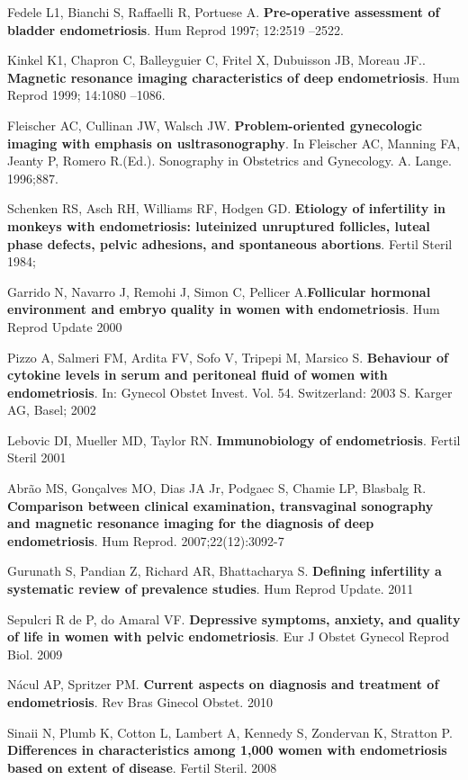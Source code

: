 \documentclass[12pt]{article} %
\begin{document}
Fedele L1, Bianchi S, Raffaelli R, Portuese A. \textbf{Pre-operative assessment of bladder endometriosis}. Hum Reprod 1997; 12:2519 –2522.

Kinkel K1, Chapron C, Balleyguier C, Fritel X, Dubuisson JB, Moreau JF.. \textbf{Magnetic resonance imaging characteristics of deep endometriosis}. Hum Reprod 1999; 14:1080 –1086.

Fleischer AC, Cullinan JW, Walsch JW.\textbf{ Problem-oriented gynecologic imaging with emphasis on usltrasonography}. In Fleischer AC, Manning FA, Jeanty P, Romero R.(Ed.). Sonography in Obstetrics and Gynecology. A.
Lange. 1996;887.

Schenken RS, Asch RH, Williams RF, Hodgen GD.\textbf{ Etiology of infertility in
monkeys with endometriosis: luteinized unruptured follicles, luteal phase
defects, pelvic adhesions, and spontaneous abortions}. Fertil Steril 1984;

Garrido N, Navarro J, Remohi J, Simon C, Pellicer A.\textbf{Follicular hormonal
environment and embryo quality in women with endometriosis}. Hum
Reprod Update 2000

Pizzo A, Salmeri FM, Ardita FV, Sofo V, Tripepi M, Marsico S. \textbf{Behaviour of
cytokine levels in serum and peritoneal fluid of women with endometriosis}.
In: Gynecol Obstet Invest. Vol. 54. Switzerland: 2003 S. Karger AG, Basel;
2002

Lebovic DI, Mueller MD, Taylor RN.\textbf{ Immunobiology of endometriosis}. Fertil
Steril 2001

Abrão MS, Gonçalves MO, Dias JA Jr, Podgaec S, Chamie LP, Blasbalg R. \textbf{Comparison between clinical examination, transvaginal sonography and magnetic resonance imaging for the diagnosis of
    deep endometriosis}. Hum Reprod. 2007;22(12):3092-7

Gurunath S, Pandian Z, Richard AR, Bhattacharya S. \textbf{Defining infertility a systematic review of prevalence studies}. Hum Reprod Update. 2011


Sepulcri R de P, do Amaral VF.
\textbf{Depressive symptoms, anxiety, and quality
of life in women with pelvic endometriosis}.
Eur J Obstet Gynecol Reprod Biol.
2009


Nácul AP, Spritzer PM. \textbf{Current aspects
on
diagnosis
and
treatment
of
endometriosis}. Rev Bras Ginecol Obstet.
2010


Sinaii N, Plumb K, Cotton L, Lambert A, Kennedy S, Zondervan K, Stratton P. \textbf{Differences in characteristics among 1,000 women with endometriosis based on extent of disease}. Fertil Steril. 2008
\end{document}

